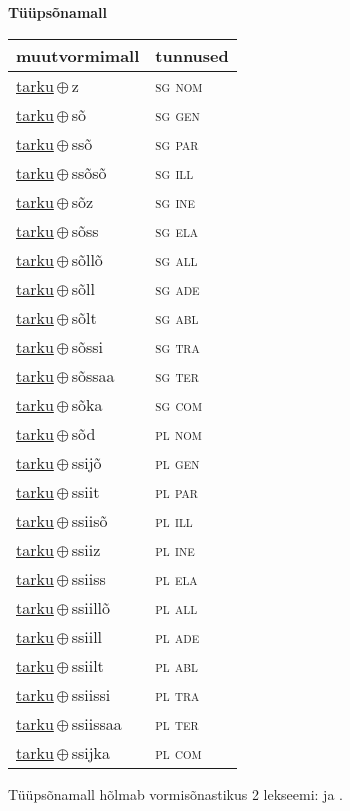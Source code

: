 

\vspace{3.5em}
\noindent \begin{minipage}{\textwidth}
\noindent \textbf{Tüüpsõnamall \,}\\

\begin{sideways}
\begin{tabular}{l l}
muutvormimall & tunnused \\
\hline
\underline{tarku}\,$\oplus$\,z & \textsc{ sg nom } \\
\underline{tarku}\,$\oplus$\,sõ & \textsc{ sg gen } \\
\underline{tarku}\,$\oplus$\,ssõ & \textsc{ sg par } \\
\underline{tarku}\,$\oplus$\,ssõsõ & \textsc{ sg ill } \\
\underline{tarku}\,$\oplus$\,sõz & \textsc{ sg ine } \\
\underline{tarku}\,$\oplus$\,sõss & \textsc{ sg ela } \\
\underline{tarku}\,$\oplus$\,sõllõ & \textsc{ sg all } \\
\underline{tarku}\,$\oplus$\,sõll & \textsc{ sg ade } \\
\underline{tarku}\,$\oplus$\,sõlt & \textsc{ sg abl } \\
\underline{tarku}\,$\oplus$\,sõssi & \textsc{ sg tra } \\
\underline{tarku}\,$\oplus$\,sõssaa & \textsc{ sg ter } \\
\underline{tarku}\,$\oplus$\,sõka & \textsc{ sg com } \\
\underline{tarku}\,$\oplus$\,sõd & \textsc{ pl nom } \\
\underline{tarku}\,$\oplus$\,ssijõ & \textsc{ pl gen } \\
\underline{tarku}\,$\oplus$\,ssiit & \textsc{ pl par } \\
\underline{tarku}\,$\oplus$\,ssiisõ & \textsc{ pl ill } \\
\underline{tarku}\,$\oplus$\,ssiiz & \textsc{ pl ine } \\
\underline{tarku}\,$\oplus$\,ssiiss & \textsc{ pl ela } \\
\underline{tarku}\,$\oplus$\,ssiillõ & \textsc{ pl all } \\
\underline{tarku}\,$\oplus$\,ssiill & \textsc{ pl ade } \\
\underline{tarku}\,$\oplus$\,ssiilt & \textsc{ pl abl } \\
\underline{tarku}\,$\oplus$\,ssiissi & \textsc{ pl tra } \\
\underline{tarku}\,$\oplus$\,ssiissaa & \textsc{ pl ter } \\
\underline{tarku}\,$\oplus$\,ssijka & \textsc{ pl com } \\
\end{tabular}
\end{sideways}
\label{tab:tüüpsõnamall-tarkuz}

\end{minipage}

 
\vspace{1em}
\noindent Tüüpsõnamall  hõlmab vormisõnastikus 2 lekseemi:  ja .
